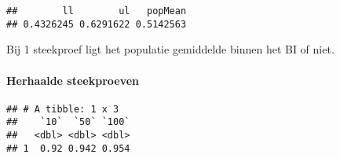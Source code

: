 \documentclass[
  12pt,dutch,coursenotes]{book}
\newenvironment{Shaded}{\begin{snugshade}}{\end{snugshade}}
\newcommand{\DataTypeTok}[1]{\textcolor[rgb]{0.13,0.29,0.53}{#1}}
\newcommand{\FloatTok}[1]{\textcolor[rgb]{0.00,0.00,0.81}{#1}}
\newcommand{\KeywordTok}[1]{\textcolor[rgb]{0.13,0.29,0.53}{\textbf{#1}}}
\newcommand{\NormalTok}[1]{#1}
\newcommand{\OperatorTok}[1]{\textcolor[rgb]{0.81,0.36,0.00}{\textbf{#1}}}
\newcommand{\StringTok}[1]{\textcolor[rgb]{0.31,0.60,0.02}{#1}}
\theoremstyle{definition}
\theoremstyle{definition}
\theoremstyle{definition}
\theoremstyle{remark}
\begin{document}
\begin{verbatim}
##        ll        ul   popMean 
## 0.4326245 0.6291622 0.5142563
\end{verbatim}

Bij 1 steekproef ligt het populatie gemiddelde binnen het BI of niet.

\hypertarget{herhaalde-steekproeven}{%
\paragraph{Herhaalde steekproeven}\label{herhaalde-steekproeven}}

\begin{Shaded}
\end{Shaded}

\begin{verbatim}
## # A tibble: 1 x 3
##    `10`  `50` `100`
##   <dbl> <dbl> <dbl>
## 1  0.92 0.942 0.954
\end{verbatim}
\end{document}
